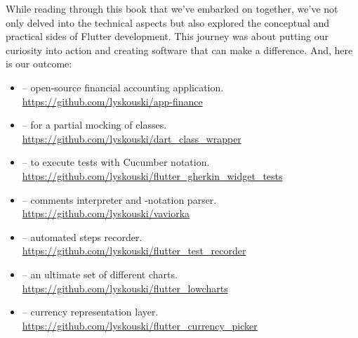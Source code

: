 
While reading through this book that we've embarked on together, we've not only delved into the technical aspects but 
also explored the conceptual and practical sides of Flutter development. This journey was about putting our curiosity 
into action and creating software that can make a difference. And, here is our outcome:

\begin{itemize}
\item {} -- open-source financial accounting application.\\
\href{https://github.com/lyskouski/app-finance}{https://github.com/lyskouski/app-finance}

\item {} -- for a partial mocking of classes.\\
\href{https://github.com/lyskouski/dart\_class\_wrapper}{https://github.com/lyskouski/dart\_class\_wrapper}

\item {} -- to execute tests with Cucumber notation.\\
\href{https://github.com/lyskouski/flutter\_gherkin\_widget\_tests}{https://github.com/lyskouski/flutter\_gherkin\_widget\_tests}

\item {} --  comments interpreter and -notation parser.\\
\href{https://github.com/lyskouski/vaviorka}{https://github.com/lyskouski/vaviorka}

\item {} -- automated steps recorder.\\
\href{https://github.com/lyskouski/flutter\_test\_recorder}{https://github.com/lyskouski/flutter\_test\_recorder}

\item {} -- an ultimate set of different charts.\\
\href{https://github.com/lyskouski/flutter\_lowcharts}{https://github.com/lyskouski/flutter\_lowcharts}

\item {} -- currency representation layer.\\
\href{https://github.com/lyskouski/flutter\_currency\_picker}{https://github.com/lyskouski/flutter\_currency\_picker}


\end{itemize}
